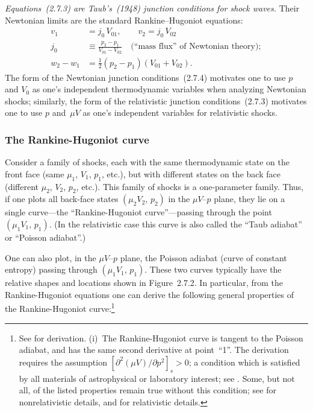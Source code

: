\emph{Equations~(2.7.3) are Taub's~(1948) junction conditions for shock waves.}
Their Newtonian limits are the standard Rankine--Hugoniot equations:
%
\begin{subequations}
\begin{align}
\tag{2.7.4a}
v_1 &= j_0\,V_{01},\qquad v_2 = j_0\,V_{02}\\[4pt]
\tag{2.7.4b}
j_0 &\equiv \frac{p_2 - p_1}{V_{01} - V_{02}}\quad
\text{(``mass flux'' of Newtonian theory)};\\[4pt]
\tag{2.7.4c}
w_2 - w_1 &= \tfrac{1}{2}(p_2 - p_1)(V_{01} + V_{02}).
\end{align}
\end{subequations}
%
The form of the Newtonian junction conditions~(2.7.4) motivates one to use $p$
and $V_0$ as one's independent thermodynamic variables when analyzing Newtonian
shocks; similarly, the form of the relativistic junction conditions~(2.7.3)
motivates one to use $p$ and~$\mu V$ as one's independent variables for
relativistic shocks.

\subsubsection*{The Rankine-Hugoniot curve}

Consider a family of shocks, each with the same thermodynamic state on the
front face (same $\mu_1$, $V_1$, $p_1$, etc.), but with different states on the
back face (different $\mu_2$, $V_2$, $p_2$, etc.).  This family of shocks is
a one-parameter family.  Thus, if one plots all back-face states
$(\mu_2 V_2,\,p_2)$ in the $\mu V$--$p$ plane, they lie on a single
curve---the ``Rankine-Hugoniot curve''---passing through the point
$(\mu_1 V_1,\,p_1)$.  (In the relativistic case this curve is also called the
``Taub adiabat'' or ``Poisson adiabat''.)

One can also plot, in the $\mu V$--$p$ plane, the Poisson adiabat (curve of
constant entropy) passing through $(\mu_1 V_1,\,p_1)$.  These two curves
typically have the relative shapes and locations shown in Figure~2.7.2.  In
particular, from the Rankine-Hugoniot equations one can derive the following
general properties of the Rankine-Hugoniot
curve:\footnote{See \citet{Thorne1973a} for derivation.  (i)~The
  Rankine-Hugoniot curve is tangent to the Poisson adiabat, and has the same
  second derivative at point~``1''.  The derivation requires the assumption
  $[\partial^2(\mu V)/\partial p^2]_{s} > 0$; a condition which is satisfied
  by all materials of astrophysical or laboratory interest; see
  \citet{LandauLifshitz1959}.  Some, but not all, of the listed properties
  remain true without this condition; see \citet{ZeldovichRaizer1966} for
  nonrelativistic details, and \citet{Thorne1973a} for relativistic details.}

